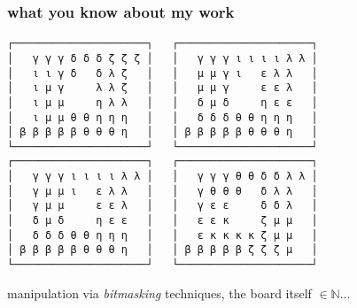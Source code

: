 \documentclass{beamer}
\begin{document}
\begin{frame}[fragile]
\frametitle{what you know about my work}
\begin{Verbatim}[baselinestretch=0.1, fontsize=\footnotesize]
┌─────────────────────┐   ┌─────────────────────┐
│   γ γ γ δ δ δ ζ ζ ζ │   │   γ γ γ ι ι ι ι λ λ │
│   ι ι γ δ   δ λ ζ   │   │   μ μ γ ι   ε λ λ   │
│   ι μ γ     λ λ ζ   │   │   μ μ γ     ε ε λ   │
│   ι μ μ     η λ λ   │   │   δ μ δ     η ε ε   │
│   ι μ μ θ θ η η η   │   │   δ δ δ θ θ η η η   │
│ β β β β β θ θ θ η   │   │ β β β β β θ θ θ η   │
└─────────────────────┘   └─────────────────────┘
┌─────────────────────┐   ┌─────────────────────┐
│   γ γ γ ι ι ι ι λ λ │   │   γ γ γ θ θ δ δ λ λ │
│   γ μ μ ι   ε λ λ   │   │   γ θ θ θ   δ λ λ   │
│   γ μ μ     ε ε λ   │   │   γ ε ε     δ δ λ   │
│   δ μ δ     η ε ε   │   │   ε ε κ     ζ μ μ   │
│   δ δ δ θ θ η η η   │   │   ε κ κ κ κ ζ μ μ   │
│ β β β β β θ θ θ η   │   │ β β β β β ζ ζ ζ μ   │
└─────────────────────┘   └─────────────────────┘
\end{Verbatim}
manipulation via \textit{bitmasking} techniques, the board itself $\in\mathbb{N}$...
\end{frame}
\end{document}
